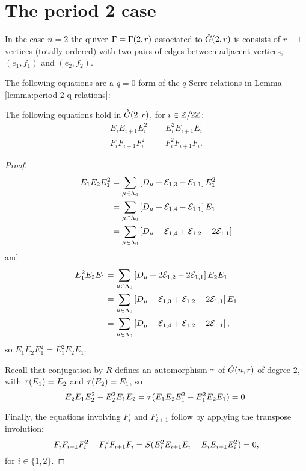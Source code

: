 \documentclass[a4paper, 11pt]{report}
\begin{document}
\section{The period 2 case}

In the case $n=2$ the quiver $\Gamma=\presentationquiver[2,r]$ associated to $\generic[2,r]$ is consists of $r+1$ vertices (totally ordered) with two pairs of edges between adjacent vertices, $(e_1,f_1)$ and $(e_2,f_2)$.

The following equations are a $q=0$ form of the $q$-Serre relations in Lemma \ref{lemma:period-2-q-relations}:

\begin{lemma}\label{lemma:period-2-0-relations}
The following equations hold in $\generic[2,r]$, for $i\in\integers/{2\integers}$:
\begin{align*}
E_iE_{i+1}E_i^2 &= E_i^2E_{i+1}E_i\\
F_iF_{i+1}F_i^2 &= F_i^2F_{i+1}F_i.
\end{align*}
\end{lemma}

\begin{proof}
\begin{align*}
E_1E_2E_1^2 &= \sum_{\mu\in\compositions} \left[\diag{\mu}+\elem{1}{3}-\elem{1}{1}\right]E_1^2\\
&= \sum_{\mu\in\compositions} \left[\diag{\mu}+\elem{1}{4}-\elem{1}{1}\right]E_1\\
&= \sum_{\mu\in\compositions} \left[\diag{\mu}+\elem{1}{4}+\elem{1}{2}-2\elem{1}{1}\right]
\end{align*}
and
\begin{align*}
E_1^2E_2E_1 &= \sum_{\mu\in\compositions} \left[\diag{\mu}+2\elem{1}{2}-2\elem{1}{1}\right]E_2E_1\\
&= \sum_{\mu\in\compositions} \left[\diag{\mu}+\elem{1}{3}+\elem{1}{2}-2\elem{1}{1}\right]E_1\\
&= \sum_{\mu\in\compositions} \left[\diag{\mu}+\elem{1}{4}+\elem{1}{2}-2\elem{1}{1}\right],
\end{align*}
so $E_1E_2E_1^2 = E_1^2E_2E_1$.

Recall that conjugation by $R$ defines an automorphism $\rotation{}$ of $\generic$ of degree $2$, with $\rotation{(E_1)}=E_2$ and $\rotation{(E_2)}=E_1$, so
\begin{equation*}
E_2E_1E_2^2 - E_2^2E_1E_2 = \rotation{(E_1E_2E_1^2-E_1^2E_2E_1)} = 0.
\end{equation*}

Finally, the equations involving $F_i$ and $F_{i+1}$ follow by applying the transpose involution:
\begin{equation*}
F_iF_{i+1}F_i^2 - F_i^2F_{i+1}F_i = \antipode{(E_i^2E_{i+1}E_i-E_iE_{i+1}E_i^2)} = 0,
\end{equation*}
for $i\in\{1,2\}$.
\end{proof}
\end{document}
